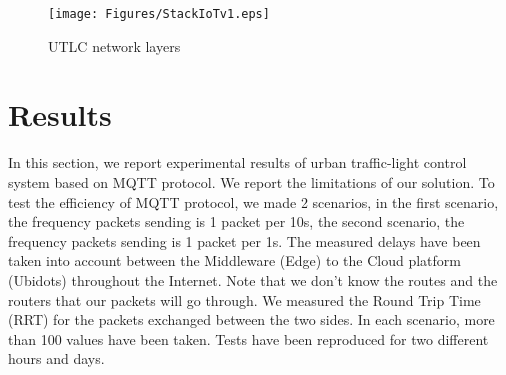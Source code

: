 %
%


\begin{figure}[!htb]
\centering
\texttt{[image: Figures/StackIoTv1.eps]}
\caption{UTLC network layers}
\label{fig:StackIoT.pdf}
\end{figure}

\section{Results} \label{sec:Results}

In this section, we report experimental results of urban traffic-light control system based on MQTT protocol. We report the limitations of our solution. To test the efficiency of MQTT protocol, we made 2 scenarios, in the first scenario, the frequency  packets sending  is 1 packet per 10s, the second scenario, the frequency  packets sending  is 1 packet per 1s. The measured delays have been taken into account between the Middleware (Edge) to the Cloud platform (Ubidots) throughout the Internet. Note that we don't know the routes and the routers that our packets will go through. We measured the Round Trip Time (RRT) for the packets exchanged between the two sides. In each scenario, more than 100 values have been taken. Tests have been reproduced for two different hours and days.


